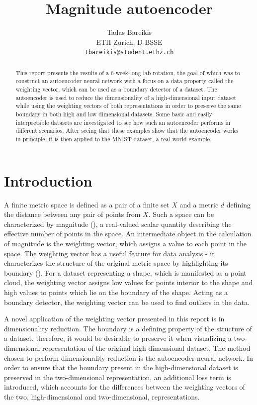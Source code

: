 \documentclass{article}
\title{Magnitude autoencoder}
\author{%
  Tadas Bareikis\\
  ETH Zurich, D-BSSE\\
  \texttt{tbareikis@student.ethz.ch} \\
}
\begin{document}
\maketitle

\begin{abstract}
  This report presents the results of a 6-week-long lab rotation, the goal of which was to construct an autoencoder neural network with a focus on a data property called the weighting vector, which can be used as a boundary detector of a dataset. The autoencoder is used to reduce the dimensionality of a high-dimensional input dataset while using the weighting vectors of both representations in order to preserve the same boundary in both high and low dimensional datasets. Some basic and easily interpretable datasets are investigated to see how such an autoencoder performs in different scenarios. After seeing that these examples show that the autoencoder works in principle, it is then applied to the MNIST dataset, a real-world example.
\end{abstract}

\section{Introduction}

A finite metric space is defined as a pair of a finite set $X$ and a metric $d$ defining the distance between any pair of points from $X$. Such a space can be characterized by magnitude (\cite{Leinster2010}), a real-valued scalar quantity describing the effective number of points in the space. An intermediate object in the calculation of magnitude is the weighting vector, which assigns a value to each point in the space. The weighting vector has a useful feature for data analysis - it characterizes the structure of the original metric space by highlighting its boundary (\cite{Bunch2021}). For a dataset representing a shape, which is manifested as a point cloud, the weighting vector assigns low values for points interior to the shape and high values to points which lie on the boundary of the shape. Acting as a boundary detector, the weighting vector can be used to find outliers in the data.

A novel application of the weighting vector presented in this report is in dimensionality reduction. The boundary is a defining property of the structure of a dataset, therefore, it would be desirable to preserve it when visualizing a two-dimensional representation of the original high-dimensional dataset. The method chosen to perform dimensionality reduction is the autoencoder neural network. In order to ensure that the boundary present in the high-dimensional dataset is preserved in the two-dimensional representation, an additional loss term is introduced, which accounts for the differences between the weighting vectors of the two, high-dimensional and two-dimensional, representations.
\end{document}

